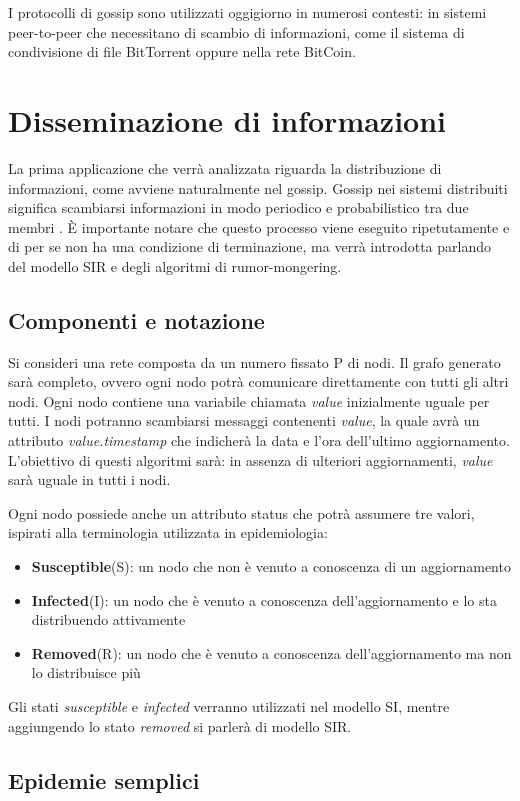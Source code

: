 I protocolli di gossip sono utilizzati oggigiorno in numerosi contesti: in sistemi peer-to-peer che necessitano di scambio di informazioni, come il sistema di condivisione di file BitTorrent \cite{bittorrent} oppure nella rete BitCoin.

\section{Disseminazione di informazioni}
La prima applicazione che verrà analizzata riguarda la distribuzione di informazioni, come avviene naturalmente nel gossip. Gossip nei sistemi distribuiti significa scambiarsi informazioni in modo periodico e probabilistico tra due membri \cite{kermarrec}. È importante notare che questo processo viene eseguito ripetutamente e di per se non ha una condizione di terminazione, ma verrà introdotta parlando del modello SIR e degli algoritmi di rumor-mongering.
\subsection{Componenti e notazione}
Si consideri una rete composta da un numero fissato P di nodi. Il grafo generato sarà completo, ovvero ogni nodo potrà comunicare direttamente con tutti gli altri nodi. Ogni nodo contiene una variabile chiamata \textit{value} inizialmente uguale per tutti. I nodi potranno scambiarsi messaggi contenenti \textit{value}, la quale avrà un attributo \textit{value.timestamp} che indicherà la data e l'ora dell'ultimo aggiornamento. L'obiettivo di questi algoritmi sarà: in assenza di ulteriori aggiornamenti, \textit{value} sarà uguale in tutti i nodi.

Ogni nodo possiede anche un attributo status che potrà assumere tre valori, ispirati alla terminologia utilizzata in epidemiologia:
\begin{itemize}
    \item \textbf{Susceptible}(S): un nodo che non è venuto a conoscenza di un aggiornamento
    \item \textbf{Infected}(I): un nodo che è venuto a conoscenza dell'aggiornamento e lo sta distribuendo attivamente
    \item \textbf{Removed}(R): un nodo che è venuto a conoscenza dell'aggiornamento ma non lo distribuisce più
\end{itemize}
Gli stati \textit{susceptible} e \textit{infected} verranno utilizzati nel modello SI, mentre aggiungendo lo stato \textit{removed} si parlerà di modello SIR.
\subsection{Epidemie semplici}

